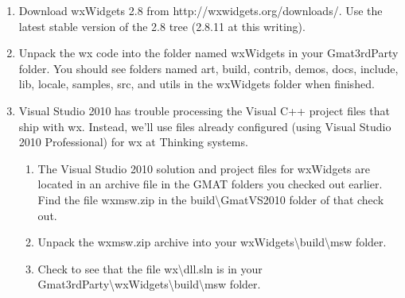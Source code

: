 \documentclass[letterpaper,10pt]{article}%
\begin{document}
\begin{enumerate}
\item Download wxWidgets 2.8 from http://wxwidgets.org/downloads/.  Use the latest stable version of the 2.8 tree (2.8.11 at this writing).
\item Unpack the wx code into the folder named wxWidgets in your Gmat3rdParty folder.  You should see folders named art, build, contrib, demos, docs, include, lib, locale, samples, src, and utils in the wxWidgets folder when finished.
\item Visual Studio 2010 has trouble processing the Visual C++ project files that ship with wx.  Instead, we'll use files already configured (using Visual Studio 2010 Professional) for wx at Thinking systems. 
\begin{enumerate}
\item The Visual Studio 2010 solution and project files for wxWidgets are located in an archive file in the GMAT folders you checked out earlier.  Find the file wxmsw.zip in the build\textbackslash GmatVS2010 folder of that check out.
\item Unpack the wxmsw.zip archive into your wxWidgets\textbackslash build\textbackslash msw folder.
\item Check to see that the file wx\textbackslash dll.sln is in your Gmat3rdParty\textbackslash wxWidgets\textbackslash build\textbackslash msw folder.
\end{enumerate}
 
\end{enumerate}
\end{document}
